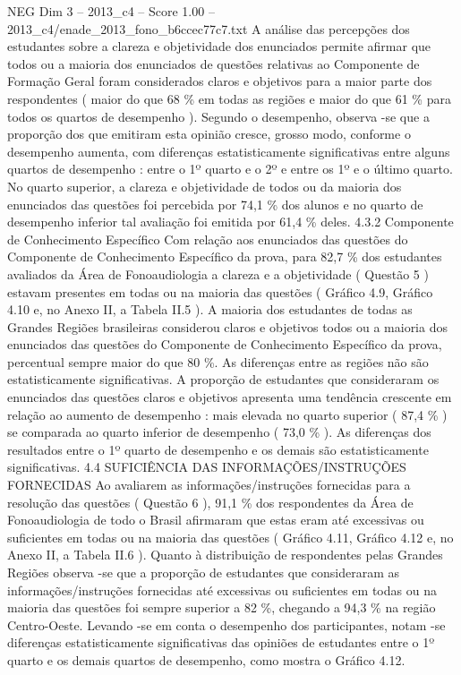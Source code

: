 \begin{textsample}{NEG Dim 3 – 2013\_c4 – Score 1.00 – 2013\_c4/enade\_2013\_fono\_b6ccec77c7.txt}
A análise das percepções dos estudantes sobre a clareza e objetividade dos enunciados permite afirmar que todos ou a maioria dos enunciados de questões relativas ao Componente de Formação Geral foram considerados claros e objetivos para a maior parte dos respondentes ( maior do que 68 \% em todas as regiões e maior do que 61 \% para todos os quartos de desempenho ).
Segundo o desempenho, observa -se que a proporção dos que emitiram esta opinião cresce, grosso modo, conforme o desempenho aumenta, com diferenças estatisticamente significativas entre alguns quartos de desempenho : entre o 1º quarto e o 2º e entre os 1º e o último quarto.
No quarto superior, a clareza e objetividade de todos ou da maioria dos enunciados das questões foi percebida por 74,1 \% dos alunos e no quarto de desempenho inferior tal avaliação foi emitida por 61,4 \% deles. 4.3.2 Componente de Conhecimento Específico Com relação aos enunciados das questões do Componente de Conhecimento Específico da prova, para 82,7 \% dos estudantes avaliados da Área de Fonoaudiologia a clareza e a objetividade ( Questão 5 ) estavam presentes em todas ou na maioria das questões ( Gráfico 4.9, Gráfico 4.10 e, no Anexo II, a Tabela II.5 ).
A maioria dos estudantes de todas as Grandes Regiões brasileiras considerou claros e objetivos todos ou a maioria dos enunciados das questões do Componente de Conhecimento Específico da prova, percentual sempre maior do que 80 \%.
As diferenças entre as regiões não são estatisticamente significativas.
A proporção de estudantes que consideraram os enunciados das questões claros e objetivos apresenta uma tendência crescente em relação ao aumento de desempenho : mais elevada no quarto superior ( 87,4 \% ) se comparada ao quarto inferior de desempenho ( 73,0 \% ).
As diferenças dos resultados entre o 1º quarto de desempenho e os demais são estatisticamente significativas. 4.4 SUFICIÊNCIA DAS INFORMAÇÕES/INSTRUÇÕES FORNECIDAS Ao avaliarem as informações/instruções fornecidas para a resolução das questões ( Questão 6 ), 91,1 \% dos respondentes da Área de Fonoaudiologia de todo o Brasil afirmaram que estas eram até excessivas ou suficientes em todas ou na maioria das questões ( Gráfico 4.11, Gráfico 4.12 e, no Anexo II, a Tabela II.6 ).
Quanto à distribuição de respondentes pelas Grandes Regiões observa -se que a proporção de estudantes que consideraram as informações/instruções fornecidas até excessivas ou suficientes em todas ou na maioria das questões foi sempre superior a 82 \%, chegando a 94,3 \% na região Centro-Oeste.
Levando -se em conta o desempenho dos participantes, notam -se diferenças estatisticamente significativas das opiniões de estudantes entre o 1º quarto e os demais quartos de desempenho, como mostra o Gráfico 4.12.

\end{textsample}
